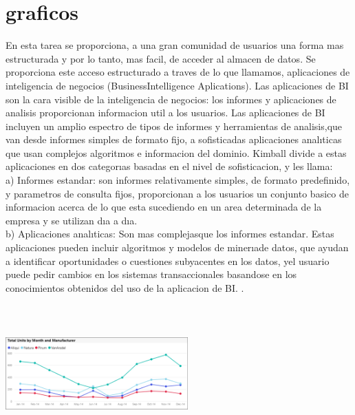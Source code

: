 \documentclass[twoside,twocolumn]{article}
\begin{document}
\section{graficos}

En esta tarea se proporciona, a una gran comunidad de usuarios una forma mas estructurada y por lo tanto, mas facil, de acceder al almacen de datos. Se proporciona este acceso estructurado a traves de lo que llamamos, aplicaciones de inteligencia de negocios (BusinessIntelligence Aplications). Las aplicaciones de BI son la cara visible de la inteligencia de negocios: los informes y aplicaciones de analisis proporcionan informacion util a los usuarios. Las aplicaciones de BI incluyen un amplio espectro de tipos de informes y herramientas de analisis,que van desde informes simples de formato fijo, a sofisticadas aplicaciones analıticas que usan complejos algoritmos e informacion del dominio. Kimball divide a estas aplicaciones en dos categorıas basadas en el nivel de sofisticacion, y les llama: \\a) Informes estandar: son informes relativamente simples, de formato predefinido, y parametros de consulta fijos, proporcionan a los usuarios un conjunto basico de informacion acerca de lo que esta sucediendo en un area determinada de la empresa y se utilizan dıa a dıa. \\b) Aplicaciones analıticas: Son mas complejasque los informes estandar. Estas aplicaciones pueden incluir algoritmos y modelos de minerıade  datos,  que  ayudan  a  identificar  oportunidades  o  cuestiones  subyacentes  en  los  datos,  yel usuario puede pedir cambios en los sistemas transaccionales basandose en los conocimientos obtenidos del uso de la aplicacion de BI. . \\\\
 
\includegraphics[width=7cm, height=5cm]{Imagenes/power-bi-line}
\\ 

   


\end{document}
